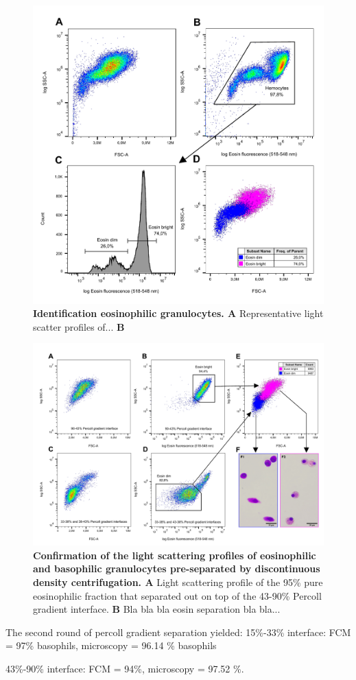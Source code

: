 \begin{figure}[!ht]
    \centering
    \includegraphics[width=1.0\textwidth]{figures/Eosin and Percoll exp/Pool II 0.75 per m.pdf}
    \caption{\textbf{Identification eosinophilic granulocytes. A} Representative light scatter profiles of... \textbf{B} }
    \label{fig:eosin_exp2}
\end{figure}

\begin{figure}[!ht]
    \centering
    \includegraphics[width=1.0\textwidth]{figures/Eosin and Percoll exp/Percoll sep for Inkscape 2.pdf}
    \caption{\textbf{Confirmation of the light scattering profiles of eosinophilic and basophilic granulocytes pre-separated by discontinuous density centrifugation. A} Light scattering profile of the 95\% pure eosinophilic fraction that separated out on top of the 43-90\% Percoll gradient interface. \textbf{B} Bla bla bla eosin separation bla bla...}
    \label{fig:Percoll-dotplots}
\end{figure}

The second round of percoll gradient separation yielded:
15\%-33\% interface: FCM = 97\% basophils, microscopy = 96.14 \% basophils

43\%-90\% interface: FCM = 94\%, microscopy = 97.52 \%. 







